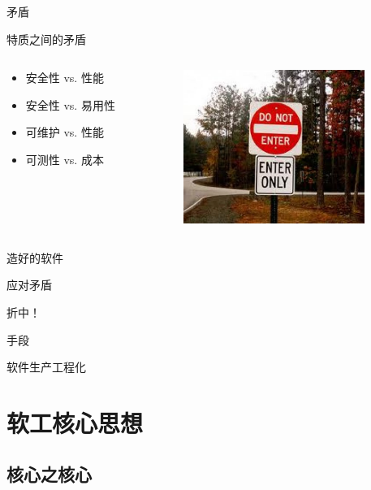 \begin{frame}{矛盾}
  \begin{block}{特质之间的矛盾}
    \begin{columns}
      \begin{column}{4cm}
        \begin{itemize}
          \item 安全性 vs. 性能
          \item 安全性 vs. 易用性
          \item 可维护 vs. 性能
          \item 可测性 vs. 成本
        \end{itemize}
      \end{column}
      \begin{column}{6cm}
        \includegraphics[height=5cm]{contradiction.jpg}
      \end{column}
    \end{columns}
  \end{block}
\end{frame}

\begin{frame}{造好的软件}
  \begin{alertblock}{应对矛盾}
    \begin{center}
      \Huge 折中！
    \end{center}
  \end{alertblock}
  \pause
  \begin{block}{手段}
    \begin{center}
      \Huge 软件生产工程化
    \end{center}
  \end{block}
\end{frame}

\section{软工核心思想}

\subsection{核心之核心}

